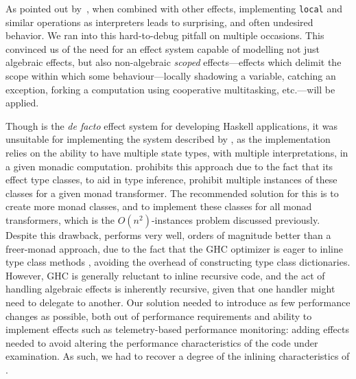 \documentclass[acmsmall,fleqn,12pt]{acmart}
\begin{document}
As pointed out by~\citet{wu2014effect}, when combined with other effects,
implementing \texttt{local} and similar operations as interpreters leads to
surprising, and often undesired behavior. We ran into this hard-to-debug pitfall
on multiple occasions.
%
%
This
convinced us of the need for
an effect system capable of modelling not just algebraic effects, but also
non-algebraic \emph{scoped} effects—effects which delimit the scope within which
some behaviour---locally shadowing a variable, catching an exception, forking a
computation using cooperative multitasking, etc.---will be applied.

Though \mtl{} is the \emph{de facto} effect system for developing Haskell
applications, it was unsuitable for implementing the system described by
\citet{Darais17Abstracting}, as the implementation relies on the ability to have
multiple state types, with multiple interpretations, in a given monadic
computation. \mtl{} prohibits this approach due to the fact that its effect type
classes, to aid in type inference, prohibit multiple instances of these classes
for a given monad transformer. The recommended solution for this is to create
more monad classes, and to implement these classes for all monad transformers,
which is the $O(n^2)$-instances problem discussed previously. Despite this
drawback, \mtl{} performs very well, orders of magnitude better than a
freer-monad approach, due to the fact that the GHC optimizer is eager to inline
type class methods \cite{PeytonJones02Secrets}, avoiding the overhead of
constructing type class dictionaries. However, GHC is generally reluctant to
inline recursive code, and the act of handling algebraic effects is inherently
recursive, given that one handler might need to delegate to another. Our
solution needed to introduce as few performance changes as possible, both out of
performance requirements and ability to implement effects such as
telemetry-based performance monitoring: adding effects needed to avoid altering
the performance characteristics of the code under examination. As such,
we had to recover a degree of the inlining characteristics of \mtl{}.
\end{document}
